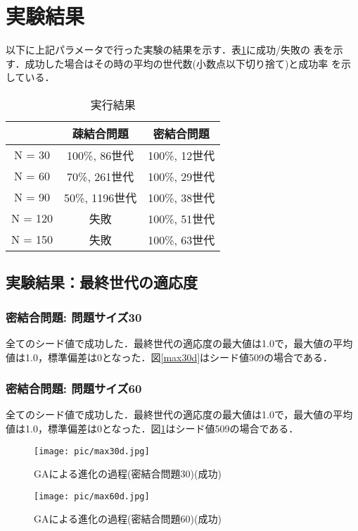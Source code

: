 \documentclass[a4j]{jarticle}
\begin{document}
\section*{実験結果}
以下に上記パラメータで行った実験の結果を示す．表\ref{result}に成功/失敗の
表を示す．成功した場合はその時の平均の世代数(小数点以下切り捨て)と成功率
を示している．

\begin{table}[htb]
 \begin{center}
  \begin{tabular}[tb]{|c||c|c|} \hline
   &疎結合問題 &密結合問題\\ \hline
   N = 30& 100\%, 86世代& 100\%, 12世代\\ \hline
   N = 60& 70\%, 261世代& 100\%, 29世代\\ \hline
   N = 90& 50\%, 1196世代& 100\%, 38世代\\ \hline
   N = 120& 失敗& 100\%, 51世代\\ \hline
   N = 150& 失敗& 100\%, 63世代\\ \hline
  \end{tabular}
  \caption{実行結果}
  \label{result}
 \end{center}
\end{table}

\clearpage
\subsection*{実験結果：最終世代の適応度}
\subsubsection*{密結合問題: 問題サイズ30}
全てのシード値で成功した．最終世代の適応度の最大値は1.0で，最大値の平均
値は1.0，標準偏差は0となった．図\ref{max30d}はシード値509の場合である．
\subsubsection*{密結合問題: 問題サイズ60}
全てのシード値で成功した．最終世代の適応度の最大値は1.0で，最大値の平均
値は1.0，標準偏差は0となった．図\ref{max60d}はシード値509の場合である．
\begin{figure}[htb]
 \begin{minipage}{0.5\hsize}
  \begin{center}
  \texttt{[image: pic/max30d.jpg]}
  \end{center}
  \caption{GAによる進化の過程(密結合問題30)(成功)}
  \label{max30d}
 \end{minipage}
 \begin{minipage}{0.5\hsize}
  \begin{center}
  \texttt{[image: pic/max60d.jpg]}
  \end{center}
  \caption{GAによる進化の過程(密結合問題60)(成功)}
  \label{max60d}
 \end{minipage}
\end{figure}
\end{document}
